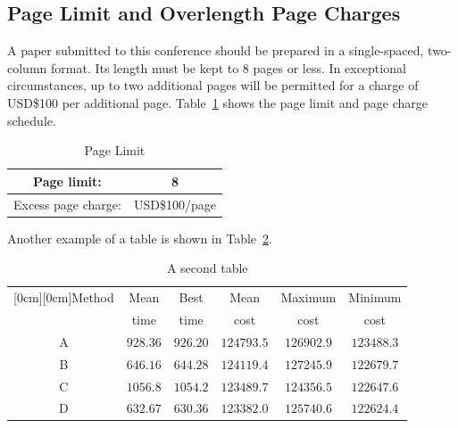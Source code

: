 \documentclass[conference]{IEEEtran}
\begin{document}
\subsection{Page Limit and Overlength Page Charges}
A paper submitted to this conference should be prepared in a
single-spaced, two-column format.  Its length must be kept to 8
pages or less.  In exceptional circumstances, up to two additional
pages will be permitted for a charge of USD\$100 per additional page.
Table~\ref{table-tab1} shows the page limit and page charge schedule.

\begin{table}
\begin{center}
\renewcommand{\arraystretch}{1.3}
\caption{Page Limit}
\label{table-tab1}
\begin{tabular}{|c|c|}
\hline
Page limit: & 8\\
\hline
Excess page charge: & USD\$100/page\\
\hline
\end{tabular}
\end{center}
\end{table}

Another example of a table is shown in Table~\ref{table-tab2}.

\begin{table}[h]
\caption{A second table}
\begin{center}
\begin{tabular}{|c|c|c|c|c|c|}
\hline
\multicolumn{1}{|c|}{\raisebox{-1.50ex}[0cm][0cm]{\!Method\!}}
& \multicolumn{1}{|c|}{Mean}
& \multicolumn{1}{|c|}{Best}
& \multicolumn{1}{|c|}{Mean}
& \multicolumn{1}{|c|}{Maximum}
& \multicolumn{1}{|c|}{Minimum} \\
& time & time & cost & cost & cost\\ \hline
A      &  $928.36$  &  $926.20$  &  $124793.5$ & $126902.9$ & $123488.3$ \\ \hline
B      &  $646.16$  &  $644.28$  &  $124119.4$ & $127245.9$ & $122679.7$ \\ \hline
C      &  $1056.8$  &  $1054.2$  &  $123489.7$ & $124356.5$ & $122647.6$ \\ \hline
D      &  $632.67$  &  $630.36$  &  $123382.0$ & $125740.6$ & $122624.4$ \\ \hline
\end{tabular}
\label{table-tab2}
\end{center}
\end{table}
\end{document}
